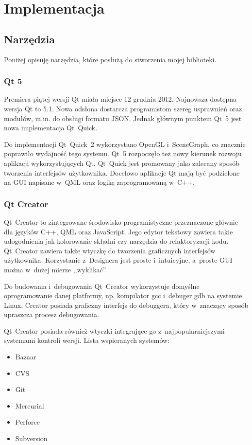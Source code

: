 \chapter{Implementacja}

\section{Narzędzia}
Poniżej opisuję narzędzia, które posłużą do stworzenia mojej biblioteki.

\subsection{Qt 5}
Premiera piątej wersji Qt miała miejsce 12 grudnia 2012. Najnowsza dostępna wersja Qt to 5.1. Nowa odsłona dostarcza programistom szereg usprawnień oraz modułów, m.in. do obsługi formatu JSON. Jednak głównym punktem Qt~5 jest nowa implementacja Qt~Quick. 

Do implementacji Qt~Quick~2 wykorzystano OpenGL i~SceneGraph, co znacznie poprawiło wydajność tego systemu. Qt~5 rozpoczęło też nowy kierunek rozwoju aplikacji wykorzystujących Qt. Qt~Quick jest promowany jako zalecany sposób tworzenia interfejsów użytkownika. Docelowo aplikacje Qt mają być podzielone na GUI napisane w~QML oraz logikę zaprogramowaną w~C++.

\subsection{Qt Creator}
Qt~Creator to zintegrowane środowisko programistyczne przeznaczone głównie dla języków C++, QML oraz JavaScript. Jego edytor tekstowy zawiera takie udogodnienia jak kolorowanie składni czy narzędzia do refaktoryzacji kodu. Qt~Creator zawiera także wtyczkę do tworzenia graficznych interfejsów użytkownika. Korzystanie z~Designera jest proste i~intuicyjne, a~proste GUI można w~dużej mierze ,,wyklikać''.

Do budowania i~debugowania Qt~Creator wykorzystuje domyślne oprogramowanie danej platformy, np. kompilator gcc i~debuger gdb na systemie Linux. Creator posiada graficzny interfejs do debuggera, który w~znaczący sposób upraszcza procesz debugowania.

Qt~Creator posiada również wtyczki integrujące go z~najpopularniejszymi systemami kontroli wersji. Lista wspieranych systemów:
\begin{itemize}
\item{Bazaar}
\item{CVS}
\item{Git}
\item{Mercurial}
\item{Perforce}
\item{Subversion}
\end{itemize}

